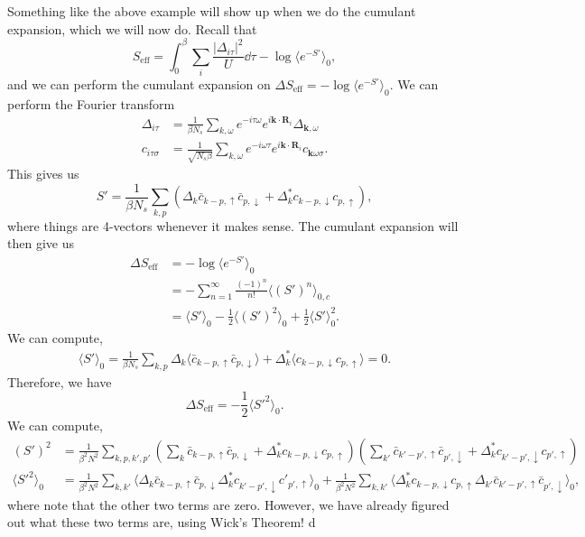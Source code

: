 \documentclass{article}
\numberwithin{equation}{section}
\begin{document}
Something like the above example will show up when we do the cumulant expansion, which we will now do. Recall that 
\begin{equation}
    S_{\text{eff}} = \int_0^\beta \sum_i \frac{|\Delta_{i\tau}|^2}{U} \dd{\tau} - \log\langle e^{-S'}\rangle_0,
\end{equation}
and we can perform the cumulant expansion on $\Delta S_{\text{eff}} = -\log \langle e^{-S'}\rangle_0.$ We can perform the Fourier transform 
\begin{align}
    \Delta_{i\tau} &= \frac{1}{\beta N_s} \sum_{k,\omega} e^{-i\tau \omega}e^{i\bm{k}\cdot \bm{R}_i} \Delta_{\bm{k},\omega} \\ 
    c_{i\tau\sigma} &= \frac{1}{\sqrt{N_s\beta}}\sum_{k,\omega}e^{-i\omega \tau}e^{i\bm{k}\cdot \bm{R}_i} c_{\bm{k}\omega\sigma}.
\end{align}
This gives us 
\begin{equation}
    S' = \frac{1}{\beta N_s}\sum_{k,p} \left(\Delta_k \bar{c}_{k-p,\uparrow}\bar{c}_{p,\downarrow} + \Delta^*_k c_{k-p,\downarrow}c_{p,\uparrow}\right),
\end{equation}
where things are 4-vectors whenever it makes sense. The cumulant expansion will then give us 
\begin{align}
    \Delta S_{\text{eff}} &= - \log \langle e^{-S'}\rangle_0 \\ 
    &=  -\sum_{n=1}^{\infty} \frac{(-1)^n}{n!}\langle (S')^n\rangle_{0,c} \\ 
    &= \langle S'\rangle_0 - \frac{1}{2}\langle (S')^2 \rangle_0 + \frac{1}{2}\langle S'\rangle_0^2.
\end{align}
We can compute,
\begin{align}
    \langle S'\rangle_0 = \frac{1}{\beta N_s}\sum_{k,p}\Delta_k \langle \bar{c}_{k-p,\uparrow} \bar{c}_{p,\downarrow}\rangle + \Delta^*_k \langle c_{k-p,\downarrow}c_{p,\uparrow}\rangle = 0 .
\end{align}
Therefore, we have 
\begin{equation}
    \Delta S_{\text{eff}} = - \frac{1}{2}\langle S'^2\rangle_0.
\end{equation}
We can compute,
\begin{align}
    (S')^2 &= \frac{1}{\beta^2N^2} \sum_{k,p,k',p'} \left(\sum_k \bar{c}_{k-p,\uparrow}\bar{c}_{p,\downarrow} + \Delta^*_k c_{k-p,\downarrow}c_{p,\uparrow}\right) \left(\sum_{k'} \bar{c}_{k'-p',\uparrow}\bar{c}_{p',\downarrow} + \Delta^*_k c_{k'-p',\downarrow}c_{p',\uparrow}\right) \\
    \langle S'^2\rangle_0 &= \frac{1}{\beta^2N^2}\sum_{k,k'} \langle \Delta_k \bar{c}_{k-p,\uparrow}\bar{c}_{p,\downarrow}\Delta^*_k c_{k'-p',\downarrow}c'_{p',\uparrow}\rangle_0 + \frac{1}{\beta^2N^2}\sum_{k,k'} \langle \Delta^*_k c_{k-p,\downarrow}c_{p,\uparrow}\Delta_{k'} \bar{c}_{k'-p',\uparrow}\bar{c}_{p',\downarrow}\rangle_0,
\end{align}
where note that the other two terms are zero. However, we have already figured out what these two terms are, using Wick's Theorem!
\newpage
d
\end{document}

